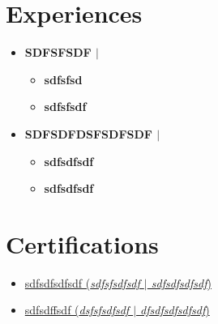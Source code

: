 \documentclass[letterpaper,5pt]{article}
\begin{document}
    
      
        \section{Experiences}
        \begin{itemize}[leftmargin=0.15in,label={}]
        
          \item{}
            \textbf{SDFSFSDF $|$ \emph{}}  \hfill 
            \begin{itemize}
            \vspace{-5pt}
            \item[\textbullet{}]\textbf{sdfsfsd}  
            \vspace{-5pt}
            \item[\textbullet{}]\textbf{sdfsfsdf}      

            \end{itemize}
          
          \item{}
            \textbf{SDFSDFDSFSDFSDF $|$ \emph{}}  \hfill 
            \begin{itemize}
            \vspace{-5pt}
            \item[\textbullet{}]\textbf{sdfsdfsdf}  
            \vspace{-5pt}
            \item[\textbullet{}]\textbf{sdfsdfsdf}      

            \end{itemize}
          
      \end{itemize}
      
    
    
        \section{Certifications}
          \begin{itemize}[leftmargin=0.45in,label={}]
          
              \item[\textbullet{}]\href{}{sdfsdfsdfsdf (\emph{sdfsfsdfsdf $|$ sdfsdfsdfsdf})} \faExternalLink
              \newline 
              \vspace{-20pt}
              \item[\textbullet{}]\href{}{sdfsdffsdf (\emph{dsfsfsdfsdf $|$ dfsdfsdfsdfsdf})} \faExternalLink
              \newline 
              \vspace{-20pt}
          \vspace{8pt}
          \end{itemize}
      
\end{document}
